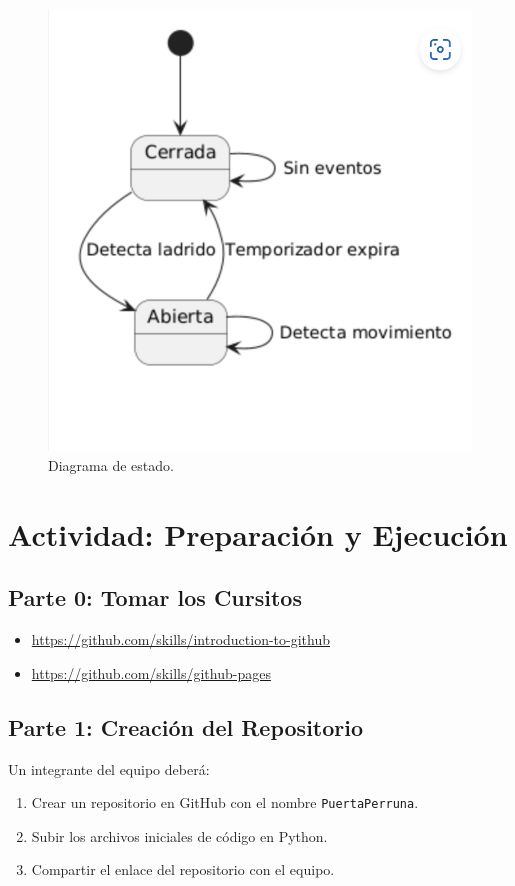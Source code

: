 \begin{figure}[!h]
\centering
\includegraphics[scale=0.5]{Pictures/estados.png}
\caption{Diagrama de estado.}
\label{fig:diag-estado}
\end{figure}

\section*{Actividad: Preparación y Ejecución}

\subsection*{Parte 0: Tomar los Cursitos}
\begin{itemize}
    \item \url{https://github.com/skills/introduction-to-github}
    \item \url{https://github.com/skills/github-pages}
\end{itemize}

\subsection*{Parte 1: Creación del Repositorio}
Un integrante del equipo deberá:
\begin{enumerate}
    \item Crear un repositorio en GitHub con el nombre \texttt{PuertaPerruna}.
    \item Subir los archivos iniciales de código en Python.
    \item Compartir el enlace del repositorio con el equipo.
\end{enumerate}

